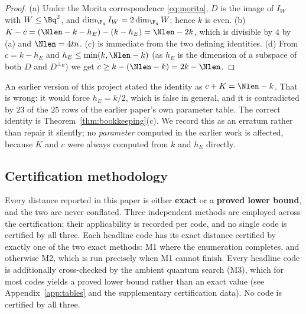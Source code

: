 \begin{proof}
(a) Under the Morita correspondence \eqref{eq:morita}, $D$ is the image of
$I_W$ with $W\le\Bq^2$, and $\dim_{\F_q}I_W=2\dim_{\F_q}W$; hence $k$ is even.
(b) $K-c=(\Nlen-k-h_E)-(k-h_E)=\Nlen-2k$, which is divisible by $4$ by (a)
and $\Nlen=4tn$. (c) is immediate from the two defining identities. (d) From
$c=k-h_E$ and $h_E\le\min(k,\Nlen-k)$ (as $h_E$ is the dimension of a subspace
of both $D$ and $D^{\perp_E}$) we get $c\ge k-(\Nlen-k)=2k-\Nlen$.
\end{proof}

\begin{remark}[erratum]
An earlier version of this project stated the identity as $c+K=\Nlen-k$. That
is wrong: it would force $h_E=k/2$, which is false in general, and it is
contradicted by $23$ of the $25$ rows of the earlier paper's own parameter
table. The correct identity is Theorem~\ref{thm:bookkeeping}(c). We record this
as an erratum rather than repair it silently; no \emph{parameter} computed in
the earlier work is affected, because $K$ and $c$ were always computed from
$k$ and $h_E$ directly.
\end{remark}

\subsection{Certification methodology}

Every distance reported in this paper is either \textbf{exact} or a
\textbf{proved lower bound}, and the two are never conflated. Three
independent methods are employed across the certification; their applicability
is recorded per code, and no single code is certified by all three. Each
headline code has its exact distance certified by exactly one of the two exact
methods: M1 where the enumeration completes, and otherwise M2, which is run
precisely when M1 cannot finish. Every headline code is additionally
cross-checked by the ambient quantum search (M3), which for most codes yields
a proved lower bound rather than an exact value (see
Appendix~\ref{app:tables} and the supplementary certification data). No code
is certified by all three.

